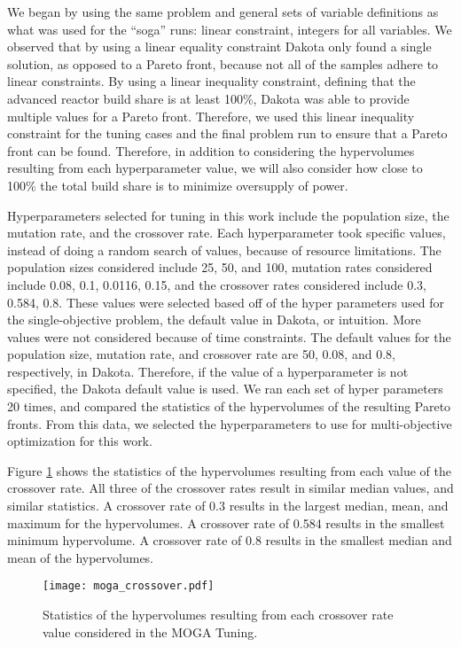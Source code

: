We began by using the same problem and general sets of variable definitions 
as what was used for the ``soga'' runs: linear constraint, integers for 
all variables. We observed that by using a linear equality constraint
Dakota only found a single solution, as opposed to a Pareto front, because 
not all of the samples adhere to linear constraints. By using a linear 
inequality constraint, defining that the advanced reactor build share is 
at least 100\%, Dakota was able to provide multiple values for a Pareto front. 
Therefore, we used this linear inequality constraint for the tuning cases and 
the final problem run to ensure that a Pareto front can be found. Therefore, 
in addition to considering the hypervolumes resulting from each hyperparameter 
value, we will also consider how close to 100\% the total build share is 
to minimize oversupply of power.

Hyperparameters selected for tuning in this work include the 
population size, the mutation rate, and the crossover rate. Each 
hyperparameter took specific values, instead of doing a random 
search of values, because of resource limitations. The population 
sizes considered include 25, 50, and 100, mutation rates considered 
include 0.08, 0.1, 0.0116, 0.15, and the crossover rates 
considered include 0.3, 0.584, 0.8. These values 
were selected based off of the hyper parameters used for the single-objective 
problem, the default value in Dakota, or intuition. More values were not 
considered because of time constraints. The default values for 
the population size, mutation rate, and crossover rate are 50, 
0.08, and 0.8, respectively, in Dakota. Therefore, if the value of a 
hyperparameter is not specified, the Dakota default value is used.  
We ran each set of hyper 
parameters 20 times, and compared the statistics of the hypervolumes of 
the resulting Pareto fronts. From this data, we selected the 
hyperparameters to use for multi-objective optimization for this work. 


Figure \ref{fig:moga_crossover} shows the statistics of the hypervolumes 
resulting from each value of the crossover rate. All three of the 
crossover rates result in similar median values, and similar statistics. 
A crossover rate of 
0.3 results in the largest median, mean, and maximum for the 
hypervolumes. A crossover rate of 0.584 results in the smallest minimum 
hypervolume. A crossover rate of 0.8 results in the smallest median 
and mean of the hypervolumes. 

\begin{figure}
    \centering 
    \texttt{[image: moga\_crossover.pdf]}
    \caption{Statistics of the hypervolumes resulting from each 
    crossover rate value considered in the MOGA Tuning.}
    \label{fig:moga_crossover}
\end{figure}


